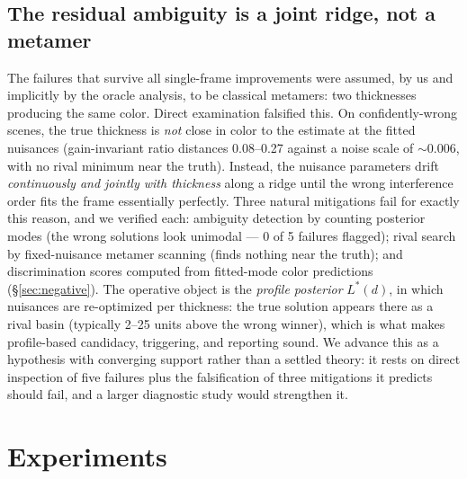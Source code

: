 \documentclass[10pt]{article}
\begin{document}
\subsection{The residual ambiguity is a joint ridge, not a metamer}\label{sec:ridges}

The failures that survive all single-frame improvements were assumed, by us and implicitly by the oracle analysis, to be classical metamers: two thicknesses producing the same color. Direct examination falsified this. On confidently-wrong scenes, the true thickness is \emph{not} close in color to the estimate at the fitted nuisances (gain-invariant ratio distances 0.08--0.27 against a noise scale of $\sim$0.006, with no rival minimum near the truth). Instead, the nuisance parameters drift \emph{continuously and jointly with thickness} along a ridge until the wrong interference order fits the frame essentially perfectly. Three natural mitigations fail for exactly this reason, and we verified each: ambiguity detection by counting posterior modes (the wrong solutions look unimodal --- 0 of 5 failures flagged); rival search by fixed-nuisance metamer scanning (finds nothing near the truth); and discrimination scores computed from fitted-mode color predictions (\S\ref{sec:negative}). The operative object is the \emph{profile posterior} $L^*(d)$, in which nuisances are re-optimized per thickness: the true solution appears there as a rival basin (typically 2--25 units above the wrong winner), which is what makes profile-based candidacy, triggering, and reporting sound. We advance this as a hypothesis with converging support rather than a settled theory: it rests on direct inspection of five failures plus the falsification of three mitigations it predicts should fail, and a larger diagnostic study would strengthen it.

\section{Experiments}\label{sec:experiments}
\end{document}
